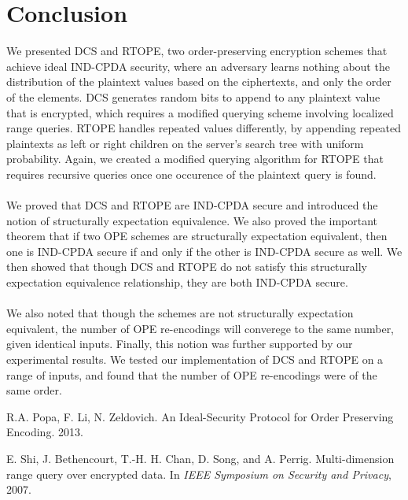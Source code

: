 \documentclass[12pt]{article}
\begin{document}
\section{Conclusion}
 We presented DCS and RTOPE, two order-preserving encryption schemes that achieve ideal IND-CPDA security, where an adversary learns nothing about the distribution of the plaintext values based on the ciphertexts, and only the order of the elements. DCS generates random bits to append to any plaintext value that is encrypted, which requires a modified querying scheme involving localized range queries. RTOPE handles repeated values differently, by appending repeated plaintexts as left or right children on the server's search tree with uniform probability. Again, we created a modified querying algorithm for RTOPE that requires recursive queries once one occurence of the plaintext query is found. \\ \\
We proved that DCS and RTOPE are IND-CPDA secure and introduced the notion of structurally expectation equivalence. We also proved the important theorem that if two OPE schemes are structurally expectation equivalent, then one is IND-CPDA secure if and only if the other is IND-CPDA secure as well. We then showed that though DCS and RTOPE do not satisfy this structurally expectation equivalence relationship, they are both IND-CPDA secure. \\ \\
We also noted that though the schemes are not structurally expectation equivalent, the number of OPE re-encodings will converege to the same number, given identical inputs. Finally, this notion was further supported by our experimental results. We tested our implementation of DCS and RTOPE on a range of inputs, and found that the number of OPE re-encodings were of the same order.
  
\begin{thebibliography}{9}

  R.A. Popa, F. Li, N. Zeldovich.
  An Ideal-Security Protocol for Order Preserving Encoding.
  2013.
  
  E. Shi, J. Bethencourt, T.-H. H. Chan, D. Song, and A. Perrig.
Multi-dimension range query over encrypted data. In \emph{IEEE
Symposium on Security and Privacy}, 2007.

\end{thebibliography}
  
\end{document}
